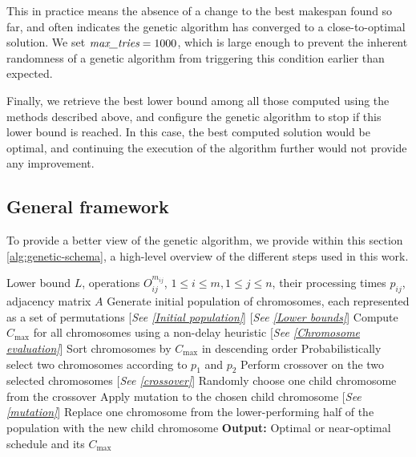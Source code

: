 \documentclass{mimosis}
\begin{document}
This in practice means the absence of a change to the best makespan found so far, and often indicates the genetic algorithm has converged to a close-to-optimal solution. We set \(\emph{max\_tries} = 1000\), which is large enough to prevent the inherent randomness of a genetic algorithm from triggering this condition earlier than expected.

Finally, we retrieve the best lower bound among all those computed using the methods described above, and configure the genetic algorithm to stop if this lower bound is reached. In this case, the best computed solution would be optimal, and continuing the execution of the algorithm further would not provide any improvement.

\subsection{General framework}

To provide a better view of the genetic algorithm, we provide within this section \cref{alg:genetic-schema}, a high-level overview of the different steps used in this work. 

\begin{algorithm}[H]
\begin{spacing}{1.2}
\label{alg:genetic-schema}
\begin{algorithmic}[1]
\Require Lower bound \(L\), operations \(O_{ij}^{m_{ij}}\), \(1 \leq i \leq m, 1 \leq j \leq n\), their processing times \(p_{ij}\), adjacency matrix \(A\) 
\State Generate initial population of chromosomes, each represented as a set of permutations [\emph{See \cref{Initial population}}]
 [\emph{See \cref{Lower bounds}}]
    \State Compute \(C_{\max}\) for all chromosomes using a non-delay heuristic [\emph{See \cref{Chromosome evaluation}}]
    \State Sort chromosomes by \(C_{\max}\) in descending order
    \State Probabilistically select two chromosomes according to \(p_1\) and \(p_2\)
    \State Perform crossover on the two selected chromosomes [\emph{See \cref{crossover}}]
    \State Randomly choose one child chromosome from the crossover
        \State Apply mutation to the chosen child chromosome [\emph{See \cref{mutation}}]
    \EndIf
    \State Replace one chromosome from the lower-performing half of the population with the new child chromosome
\EndWhile
\Statex \textbf{Output:} Optimal or near-optimal schedule and its \(C_{\max}\)
\end{algorithmic}
\end{spacing}
\end{algorithm}
\end{document}
